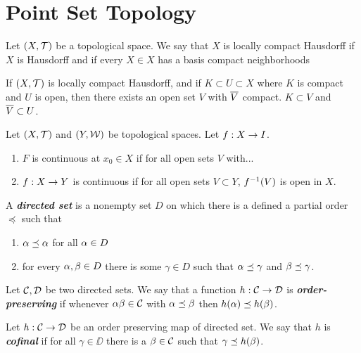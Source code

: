\newpage
\section{Point Set Topology}

\dfn Let $(X,\mathcal{T})$ be a topological space. We say that $X$ is locally compact Hausdorff if $X$ is Hausdorff and if every $X\in X$ has a basis compact neighborhoods

\setcounter{thm}{30}
\vs 

\begin{thm}
If $(X, \mathcal{T})$ is locally compact Hausdorff, and if $K\subset U\subset X$ where $K$ is compact and $U$ is open, then there exists an open set $V$ with $\overline V$ compact. $K\subset V$ and $\overline V \subset U$.
\end{thm}

\vs

\dfn Let $(X, \mathcal{T})$ and $(Y,\mathcal{W})$ be topological spaces. Let $f:X\rightarrow I$.
\begin{enumerate}[\hspace{1em}]
    \item $F$ is continuous at $x_0\in X$ if for all open sets $V$ with...
    \item $f:X\rightarrow Y$ is continuous if for all open sets $V\subset Y$, $f^{-1} (V)$ is open in $X$.
\end{enumerate}

\vs

\dfn A \textbf{\textit{directed set}} is a nonempty set $D$ on which there is a defined a partial order $\preceq$ such that
\begin{enumerate}[\hspace{1em}(i)]
    \item $\alpha \preceq \alpha$ for all $\alpha \in D$
    \item for every $\alpha,\beta\in D$ there is some $\gamma\in D$ such that $\alpha \preceq \gamma$ and $\beta \preceq \gamma$.
\end{enumerate}

\vs

\dfn Let $\mathcal{C}, \mathcal{D}$ be two directed sets. We say that a function $h:\mathcal{C} \rightarrow \mathcal{D}$ is \textbf{\textit{order-preserving}} if whenever $\alpha\beta\in \mathcal{C}$ with $\alpha\preceq \beta$ then $h(\alpha)\preceq h(\beta)$.

\vs

\dfn Let $h:\mathcal{C}\rightarrow \mathcal{D}$ be an order preserving map of directed set. We say that $h$ is \textbf{\textit{cofinal}} if for all $\gamma\in \DD$ there is a $\beta\in\mathcal{C}$ such that $\gamma \preceq h(\beta)$.

